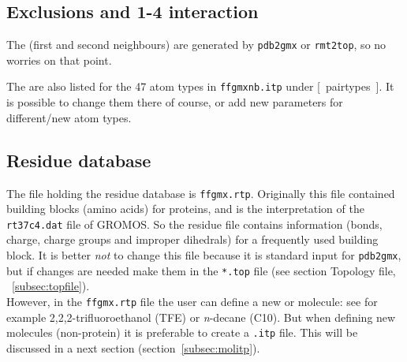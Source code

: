 \subsection{Exclusions and 1-4 interaction}
The  (first and second neighbours) are generated by
\verb'pdb2gmx' or \verb'rmt2top', so no worries on that point.

The  are also listed for the 47 atom types in
\verb'ffgmxnb.itp' under [~pairtypes~]. It is possible to change them there
of course, or add new parameters for different/new atom types.

\subsection{Residue database}
\label{subsec:rtp}
The file holding the residue database is {\tt ffgmx.rtp}. Originally
this file contained building blocks (amino acids) for proteins, and is
the {\gromacs} interpretation of the {\tt rt37c4.dat} file of GROMOS. So
the residue file contains information (bonds, charge, charge groups
and improper dihedrals) for a frequently used building block. It is
better {\em not} to change this file because it is standard input for
\verb'pdb2gmx', but if changes are needed make them in the
\verb'*.top' file (see section Topology file, ~\ref{subsec:topfile}). \\ 
However, in the {\tt ffgmx.rtp} file the user can define a new
 or molecule: see for example 2,2,2-trifluoroethanol
(TFE) or {\em n}-decane (C10). But when defining new molecules
(non-protein) it is preferable to create a {\tt *.itp}
file. This will be discussed in a next section (section~\ref{subsec:molitp}).

